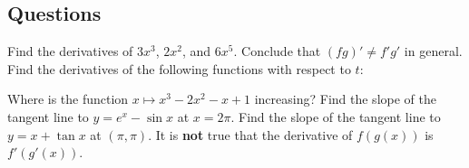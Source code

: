 \subsection*{Questions}
\begin{questions}
  \questioA Find the derivatives of $ 3x^3 $, $ 2x^2 $, and $ 6x^5 $. Conclude that $ (fg)' \neq f' g' $ in general.
  \questioA Find the derivatives of the following functions with respect to $ t $:
  \questioA Where is the function $ x \mapsto x^3 - 2x^2 - x + 1 $ increasing?
  \questioA Find the slope of the tangent line to $ y = e^x - \sin x $ at $ x = 2\pi $.
  \questioA Find the slope of the tangent line to $ y = x + \tan x $ at $ (\pi, \pi) $.
  \questioA It is \textbf{not} true that the derivative of $ f(g(x)) $ is $ f'(g'(x)) $.
\end{questions}
